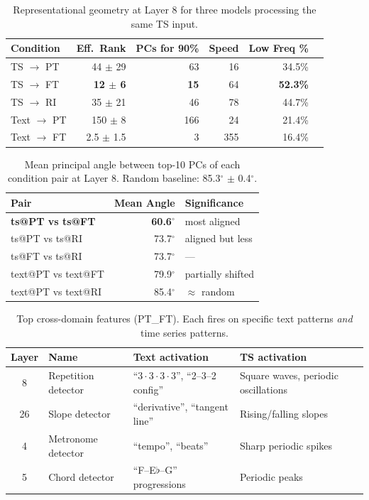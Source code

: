 \documentclass{article}
\begin{document}
\begin{table}[h]
\centering
\caption{Representational geometry at Layer 8 for three models processing the same TS input.}
\label{tab:effrank}
\begin{tabular}{lrrrrr}
\toprule
Condition & Eff.\ Rank & PCs for 90\% & Speed & Low Freq \% \\
\midrule
TS $\to$ PT  & 44 $\pm$ 29  & 63  & 16  & 34.5\% \\
TS $\to$ FT  & \textbf{12 $\pm$ 6}  & \textbf{15}  & 64  & \textbf{52.3\%} \\
TS $\to$ RI  & 35 $\pm$ 21  & 46  & 78  & 44.7\% \\
\midrule
Text $\to$ PT & 150 $\pm$ 8  & 166 & 24  & 21.4\% \\
Text $\to$ FT & 2.5 $\pm$ 1.5 & 3  & 355 & 16.4\% \\
\bottomrule
\end{tabular}
\end{table}

\begin{table}[h]
\centering
\caption{Mean principal angle between top-10 PCs of each condition pair at Layer 8. Random baseline: 85.3$^\circ$ $\pm$ 0.4$^\circ$.}
\label{tab:alignment}
\begin{tabular}{lrl}
\toprule
Pair & Mean Angle & Significance \\
\midrule
\textbf{ts@PT vs ts@FT} & \textbf{60.6$^\circ$} & most aligned \\
ts@PT vs ts@RI           & 73.7$^\circ$ & aligned but less \\
ts@FT vs ts@RI           & 73.7$^\circ$ & --- \\
text@PT vs text@FT       & 79.9$^\circ$ & partially shifted \\
text@PT vs text@RI       & 85.4$^\circ$ & $\approx$ random \\
\bottomrule
\end{tabular}
\end{table}

\begin{table}[h]
\centering
\caption{Top cross-domain features (PT\_FT). Each fires on specific text patterns \emph{and} time series patterns.}
\label{tab:features_appendix}
\begin{tabular}{clp{4.5cm}p{4.5cm}}
\toprule
Layer & Name & Text activation & TS activation \\
\midrule
8  & Repetition detector  & ``$3 \cdot 3 \cdot 3 \cdot 3$'', ``2--3--2 config'' & Square waves, periodic oscillations \\
26 & Slope detector       & ``derivative'', ``tangent line'' & Rising/falling slopes \\
4  & Metronome detector   & ``tempo'', ``beats'' & Sharp periodic spikes \\
5  & Chord detector       & ``F--E$\flat$--G'' progressions & Periodic peaks \\
\bottomrule
\end{tabular}
\end{table}
\end{document}
